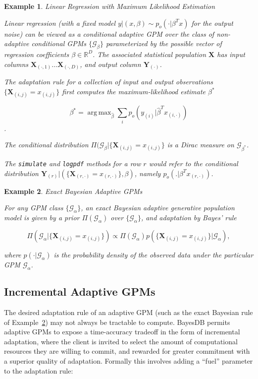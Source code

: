 \documentclass[10pt,letterpaper]{article}
\newtheorem{example}{Example}[section]
\DeclareMathOperator{\argmax}{arg\,max}
\newcommand{\set}[1]{\{#1\}}
\newcommand{\G}{\mathcal{G}}
\begin{document}
\begin{example} Linear Regression with Maximum Likelihood Estimation

Linear regression (with a fixed model $y|(x,\beta) \sim p_o(\cdot|\beta^Tx)$ 
for the output noise) can be viewed as a conditional adaptive GPM over the 
class of non-adaptive conditional GPMs $\set{\G_\beta}$ parameterized 
by the possible vector of regression coefficients $\beta \in \mathbb{R}^D$. The 
associated statistical population $\mathbf{X}$ has input columns
$\mathbf{X}_{(\cdot,1)} \dots \mathbf{X}_{(\cdot,D)}$,
and output column $\mathbf{Y}_{(\cdot)}$.

The adaptation rule for a collection of input and output observations
$\set{\mathbf{X}_{(i,j)} = x_{(i,j)}}$ 
first computes the maximum-likelihood estimate $\beta^*$

    \[
    \beta^* = \argmax_{\hat{\beta}} \sum_i
    p_o(y_{(i)}|\hat{\beta}^Tx_{(i,\cdot)})
    \].

The conditional distribution
$\Pi(\G_\beta|\set{\mathbf{X}_{(i,j)}= x_{(i,j)}}$ 
is a Dirac measure on $\G_{\beta^*}$.

The {\tt simulate} and {\tt logpdf} 
methods for a row $r$ would refer to the conditional distribution
$\mathbf{Y}_{(r)}|(\set{\mathbf{X}_{(r,\cdot)}=x_{(r,\cdot)}},\beta)$, 
namely $p_o(.|\beta^Tx_{(r,\cdot)})$.
\end{example}

\begin{example} Exact Bayesian Adaptive GPMs

For any GPM class $\{\G_\alpha\}$, an \emph{exact Bayesian adaptive generative 
population model} is given by a prior $\Pi(\G_\alpha)$ over $\{\G_\alpha\}$,
and adaptation by Bayes' rule

\[ \Pi(\G_\alpha|\set{\mathbf{X}_{(i,j)} = x_{(i,j)}}) \propto \Pi(\G_\alpha)
 p(\set{\mathbf{X}_{(i,j)} = x_{(i,j)}}|\G_\alpha), \]

where $p(\cdot|\G_\alpha)$ is the probability density of the observed data under
the particular GPM $\G_\alpha$. \label{ex:exact-bayes}
\end{example}

\subsection{Incremental Adaptive GPMs}
\label{sec:formalism-incremental-gpm}

The desired adaptation rule of an adaptive GPM (such as the exact
Bayesian rule of Example~\ref{ex:exact-bayes}) may not always be
tractable to compute.  BayesDB permits adaptive GPMs to expose a
time-accuracy tradeoff in the form of incremental adaptation, where
the client is invited to select the amount of computational resources
they are willing to commit, and rewarded for greater commitment with a
superior quality of adaptation.  Formally this involves adding a ``fuel''
parameter to the adaptation rule:
\end{document}
